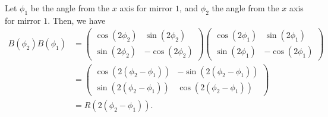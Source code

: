 \documentclass[10pt]{mypackage}
\begin{document}
\begin{example}
Let $\phi_1$ be the angle from the $x$ axis for mirror $1$, and $\phi_2$ the angle from the $x$ axis for mirror $1$. Then, we have
\begin{align*}
  B\left(\phi_2\right) B\left(\phi_1\right) &= \begin{pmatrix}\cos\left(2\phi_2\right) & \sin\left(2\phi_2\right) \\ \sin\left(2\phi_2\right) & -\cos\left(2\phi_2\right)\end{pmatrix} \begin{pmatrix}\cos\left(2\phi_1\right) & \sin\left(2\phi_1\right) \\ \sin\left(2\phi_1\right) & -\cos\left(2\phi_1\right)\end{pmatrix}\\
                                            &= \begin{pmatrix}\cos \left(2\left(\phi_2 - \phi_1\right)\right) & -\sin\left(2\left(\phi_2 - \phi_1\right)\right) \\ \sin\left(2\left(\phi_2 - \phi_1\right)\right) & \cos\left(2\left(\phi_2 - \phi_1\right)\right)\end{pmatrix}\\
                                            &= R\left(2\left(\phi_2 - \phi_1\right)\right).
\end{align*}
\end{example}
\end{document}

